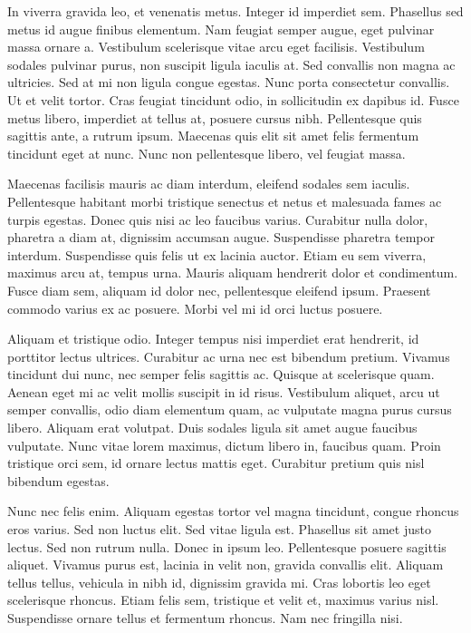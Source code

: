 \documentclass[runningheads,a4paper]{llncs}
\begin{document}
In viverra gravida leo, et venenatis metus. Integer id imperdiet sem. Phasellus sed metus id augue finibus elementum. Nam feugiat semper augue, eget pulvinar massa ornare a. Vestibulum scelerisque vitae arcu eget facilisis. Vestibulum sodales pulvinar purus, non suscipit ligula iaculis at. Sed convallis non magna ac ultricies. Sed at mi non ligula congue egestas. Nunc porta consectetur convallis. Ut et velit tortor. Cras feugiat tincidunt odio, in sollicitudin ex dapibus id. Fusce metus libero, imperdiet at tellus at, posuere cursus nibh. Pellentesque quis sagittis ante, a rutrum ipsum. Maecenas quis elit sit amet felis fermentum tincidunt eget at nunc. Nunc non pellentesque libero, vel feugiat massa.

Maecenas facilisis mauris ac diam interdum, eleifend sodales sem iaculis. Pellentesque habitant morbi tristique senectus et netus et malesuada fames ac turpis egestas. Donec quis nisi ac leo faucibus varius. Curabitur nulla dolor, pharetra a diam at, dignissim accumsan augue. Suspendisse pharetra tempor interdum. Suspendisse quis felis ut ex lacinia auctor. Etiam eu sem viverra, maximus arcu at, tempus urna. Mauris aliquam hendrerit dolor et condimentum. Fusce diam sem, aliquam id dolor nec, pellentesque eleifend ipsum. Praesent commodo varius ex ac posuere. Morbi vel mi id orci luctus posuere.

Aliquam et tristique odio. Integer tempus nisi imperdiet erat hendrerit, id porttitor lectus ultrices. Curabitur ac urna nec est bibendum pretium. Vivamus tincidunt dui nunc, nec semper felis sagittis ac. Quisque at scelerisque quam. Aenean eget mi ac velit mollis suscipit in id risus. Vestibulum aliquet, arcu ut semper convallis, odio diam elementum quam, ac vulputate magna purus cursus libero. Aliquam erat volutpat. Duis sodales ligula sit amet augue faucibus vulputate. Nunc vitae lorem maximus, dictum libero in, faucibus quam. Proin tristique orci sem, id ornare lectus mattis eget. Curabitur pretium quis nisl bibendum egestas.

Nunc nec felis enim. Aliquam egestas tortor vel magna tincidunt, congue rhoncus eros varius. Sed non luctus elit. Sed vitae ligula est. Phasellus sit amet justo lectus. Sed non rutrum nulla. Donec in ipsum leo. Pellentesque posuere sagittis aliquet. Vivamus purus est, lacinia in velit non, gravida convallis elit. Aliquam tellus tellus, vehicula in nibh id, dignissim gravida mi. Cras lobortis leo eget scelerisque rhoncus. Etiam felis sem, tristique et velit et, maximus varius nisl. Suspendisse ornare tellus et fermentum rhoncus. Nam nec fringilla nisi.
\end{document}
